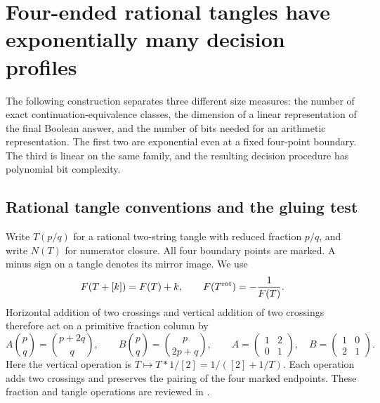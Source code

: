 
\section{Four-ended rational tangles have exponentially many decision profiles}
\label{sec:rational-continuation-rank}

The following construction separates three different size measures: the
number of exact continuation-equivalence classes, the dimension of a
linear representation of the final Boolean answer, and the number of bits
needed for an arithmetic representation.  The first two are exponential
even at a fixed four-point boundary.  The third is linear on the same
family, and the resulting decision procedure has polynomial bit complexity.

\subsection{Rational tangle conventions and the gluing test}

Write $T(p/q)$ for a rational two-string tangle with reduced fraction $p/q$,
and write $N(T)$ for numerator closure.  All four boundary points are
marked.  A minus sign on a tangle denotes its mirror image.  We use
\[
 F(T+[k])=F(T)+k,
 \qquad F(T^{\rm rot})=-\frac1{F(T)}.
\]
Horizontal addition of two crossings and vertical addition of two crossings
therefore act on a primitive fraction column by
\begin{equation}
 A\binom pq=\binom{p+2q}{q},\qquad
 B\binom pq=\binom p{2p+q},\qquad
 A=\begin{pmatrix}1&2\\0&1\end{pmatrix},\quad
 B=\begin{pmatrix}1&0\\2&1\end{pmatrix}.
 \label{eq:rational-two-twist-generators}
\end{equation}
Here the vertical operation is
$T\mapsto T*1/[2]=1/([2]+1/T)$.
Each operation adds two crossings and preserves the pairing of the four
marked endpoints.  These fraction and tangle operations are reviewed in
\cite[Section~2]{KauffmanLambropoulouHard}.

